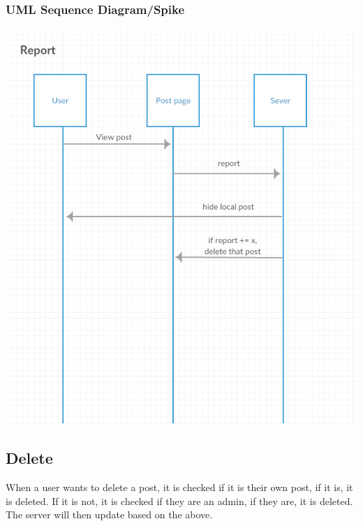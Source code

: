 \documentclass[12pt]{article}
\begin{document}
\subsubsection{UML Sequence Diagram/Spike}
\includegraphics[scale=0.5]{img/4.png}\linebreak

\subsection{Delete}
When a user wants to delete a post, it is checked if it is their own post, if it
is, it is deleted. If it is not, it is checked if they are an admin, if they
are, it is deleted. The server will then update based on the above.
\end{document}
